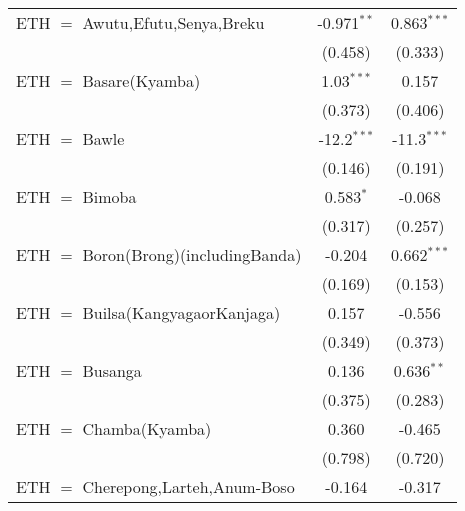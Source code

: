 \begin{table}[htbp!]
\begin{adjustbox}{width = 1\textwidth, max height = 0.95\textheight, center}
\begin{threeparttable}[b]
\begin{tabular}{lcc}
            ETH $=$ Awutu,Efutu,Senya,Breku                                           & -0.971$^{**}$ & 0.863$^{***}$\\   
                                                                                      & (0.458)       & (0.333)\\   
            ETH $=$ Basare(Kyamba)                                                    & 1.03$^{***}$  & 0.157\\   
                                                                                      & (0.373)       & (0.406)\\   
            ETH $=$ Bawle                                                             & -12.2$^{***}$ & -11.3$^{***}$\\   
                                                                                      & (0.146)       & (0.191)\\   
            ETH $=$ Bimoba                                                            & 0.583$^{*}$   & -0.068\\   
                                                                                      & (0.317)       & (0.257)\\   
            ETH $=$ Boron(Brong)(includingBanda)                                      & -0.204        & 0.662$^{***}$\\   
                                                                                      & (0.169)       & (0.153)\\   
            ETH $=$ Builsa(KangyagaorKanjaga)                                         & 0.157         & -0.556\\   
                                                                                      & (0.349)       & (0.373)\\   
            ETH $=$ Busanga                                                           & 0.136         & 0.636$^{**}$\\   
                                                                                      & (0.375)       & (0.283)\\   
            ETH $=$ Chamba(Kyamba)                                                    & 0.360         & -0.465\\   
                                                                                      & (0.798)       & (0.720)\\   
            ETH $=$ Cherepong,Larteh,Anum-Boso                                        & -0.164        & -0.317\\   

\end{tabular}
\end{threeparttable}
\end{adjustbox}
\end{table}
